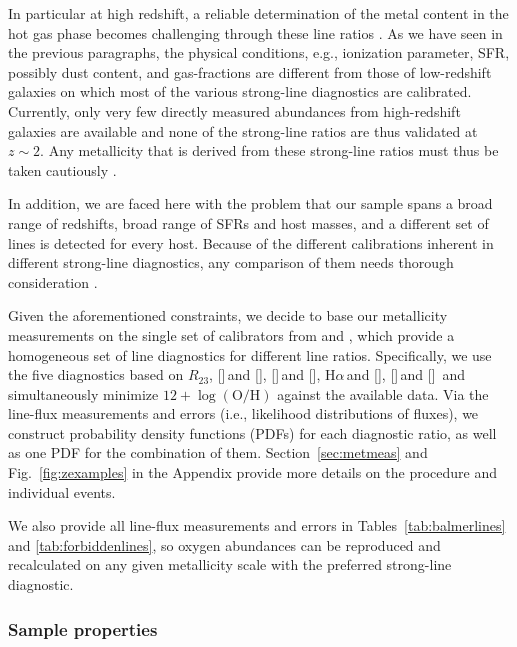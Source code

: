 \documentclass[traditabstract, longauth]{aa}
\newcommand{\ha}{H$\alpha$}
\newcommand{\oh}{12+\log(\mathrm{O/H})}
\newcommand{\oii}{[\ion{O}{ii}]}
\newcommand{\oiii}{[\ion{O}{iii}]}
\newcommand{\neiii}{[\ion{Ne}{iii}]}
\newcommand{\nii}{[\ion{N}{ii}]}
\begin{document}
In particular at high redshift, a reliable determination of the metal content in the hot gas phase becomes challenging through these line ratios \citep[e.g.,][]{2008A&A...488..463M}. As we have seen in the previous paragraphs, the physical conditions, e.g., ionization parameter, SFR, possibly dust content, and gas-fractions are different from those of low-redshift galaxies on which most of the various strong-line diagnostics are calibrated. Currently, only very few directly measured abundances from high-redshift galaxies are available \citep[e.g.,][]{2012MNRAS.427.1973C} and none of the strong-line ratios are thus validated at $z\sim2$. Any metallicity that is derived from these strong-line ratios must thus be taken cautiously \citep[e.g.,][]{2014ApJ...795..165S}.

In addition, we are faced here with the problem that our sample spans a broad range of redshifts, broad range of SFRs and host masses, and a different set of lines is detected for every host. Because of the different calibrations inherent in different strong-line diagnostics, any comparison of them needs thorough consideration \citep[e.g.,][]{2008ApJ...681.1183K}.

Given the aforementioned constraints, we decide to base our metallicity measurements on the single set of calibrators from \citet{2006A&A...459...85N} and \citet{2008A&A...488..463M}, which provide a homogeneous set of line diagnostics for different line ratios. Specifically, we use the five diagnostics based on $R_{23}$, \oii\,and \neiii, \oiii\,and \nii, \ha\,and \nii, \nii\,and \oii\, and simultaneously minimize $\oh$ against the available data. Via the line-flux measurements and errors (i.e., likelihood distributions of fluxes), we construct probability density functions (PDFs) for each diagnostic ratio, as well as one PDF for the combination of them. Section~\ref{sec:metmeas} and Fig.~\ref{fig:zexamples} in the Appendix provide more details on the procedure and individual events. 

We also provide all line-flux measurements and errors in Tables~\ref{tab:balmerlines} and \ref{tab:forbiddenlines}, so oxygen abundances can be reproduced and recalculated on any given metallicity scale with the preferred strong-line diagnostic.

\subsubsection{Sample properties}
\label{sec:metprop}
\end{document}
